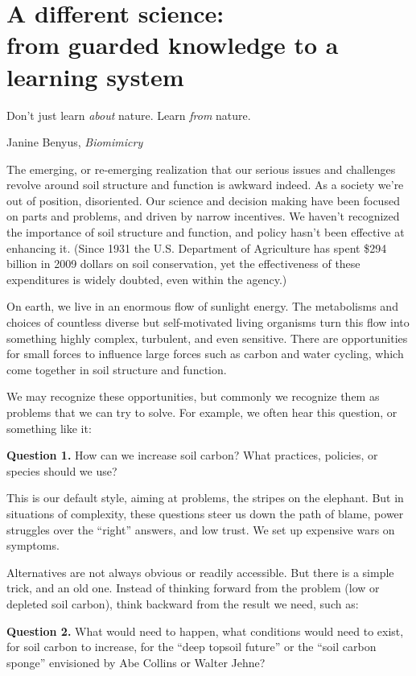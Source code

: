 \documentclass[11pt,letterpaper,twoside,onecolumn]{memoir}
\begin{document}
\chapter{A different science: \\from guarded knowledge to a learning system}

\epigraph{Don't just learn \textit{about} nature. Learn \textit{from} nature.}{Janine Benyus, \textit{Biomimicry}}

\noindent The emerging, or re-emerging realization that our serious issues and challenges revolve around soil structure and function is awkward indeed. As a society we're out of position, disoriented. Our science and decision making have been focused on parts and problems, and driven by narrow incentives. We haven't recognized the importance of soil structure and function, and policy hasn't been effective at enhancing it. (Since 1931 the U.S. Department of Agriculture has spent \$294 billion in 2009 dollars on soil conservation, yet the effectiveness of these expenditures is widely doubted, even within the agency.)

On earth, we live in an enormous flow of sunlight energy. The metabolisms and choices of countless diverse but self-motivated living organisms turn this flow into something highly complex, turbulent, and even sensitive. There are opportunities for small forces to influence large forces such as carbon and water cycling, which come together in soil structure and function. 

We may recognize these opportunities, but commonly we recognize them as problems that we can try to solve. For example, we often hear this question, or something like it:

\textbf{Question 1.} How can we increase soil carbon? What practices, policies, or species should we use? 

This is our default style, aiming at problems, the stripes on the elephant. But in situations of complexity, these questions steer us down the path of blame, power struggles over the ``right'' answers, and low trust. We set up expensive wars on symptoms.

Alternatives are not always obvious or readily accessible. But there is a simple trick, and an old one. Instead of thinking forward from the problem (low or depleted soil carbon), think backward from the result we need, such as:

\textbf{Question 2.} What would need to happen, what conditions would need to exist, for soil carbon to increase, for the ``deep topsoil future'' or the ``soil carbon sponge'' envisioned by Abe Collins or Walter Jehne?
\end{document}
